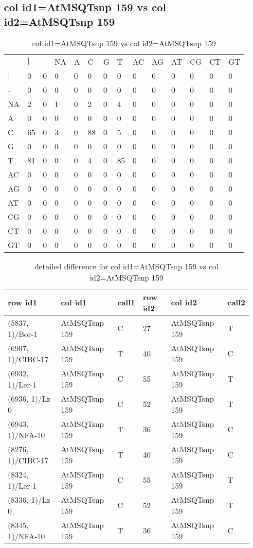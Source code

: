 \subsection{col id1=AtMSQTsnp 159 vs col id2=AtMSQTsnp 159}
\begin{center}
\begin{longtable}{|l|l|l|l|l|l|l|l|l|l|l|l|l|l|}
\caption{col id1=AtMSQTsnp 159 vs col id2=AtMSQTsnp 159} \label{table_dm732}\\
\hline
\\
\hline
&$|$&-&NA&A&C&G&T&AC&AG&AT&CG&CT&GT\\
$|$&0&0&0&0&0&0&0&0&0&0&0&0&0\\
-&0&0&0&0&0&0&0&0&0&0&0&0&0\\
NA&2&0&1&0&2&0&4&0&0&0&0&0&0\\
A&0&0&0&0&0&0&0&0&0&0&0&0&0\\
C&65&0&3&0&88&0&5&0&0&0&0&0&0\\
G&0&0&0&0&0&0&0&0&0&0&0&0&0\\
T&81&0&0&0&4&0&85&0&0&0&0&0&0\\
AC&0&0&0&0&0&0&0&0&0&0&0&0&0\\
AG&0&0&0&0&0&0&0&0&0&0&0&0&0\\
AT&0&0&0&0&0&0&0&0&0&0&0&0&0\\
CG&0&0&0&0&0&0&0&0&0&0&0&0&0\\
CT&0&0&0&0&0&0&0&0&0&0&0&0&0\\
GT&0&0&0&0&0&0&0&0&0&0&0&0&0\\
\hline
\end{longtable}
\end{center}

\begin{center}
\begin{longtable}{|l|l|l|l|l|l|}
\caption{detailed difference for col id1=AtMSQTsnp 159 vs col id2=AtMSQTsnp 159} \label{table_dm733}\\
\hline
row id1&col id1&call1&row id2&col id2&call2\\
\hline
(5837, 1)/Bor-1&AtMSQTsnp 159&C&27&AtMSQTsnp 159&T\\
(6907, 1)/CIBC-17&AtMSQTsnp 159&T&40&AtMSQTsnp 159&C\\
(6932, 1)/Ler-1&AtMSQTsnp 159&C&55&AtMSQTsnp 159&T\\
(6936, 1)/Lz-0&AtMSQTsnp 159&C&52&AtMSQTsnp 159&T\\
(6943, 1)/NFA-10&AtMSQTsnp 159&T&36&AtMSQTsnp 159&C\\
(8276, 1)/CIBC-17&AtMSQTsnp 159&T&40&AtMSQTsnp 159&C\\
(8324, 1)/Ler-1&AtMSQTsnp 159&C&55&AtMSQTsnp 159&T\\
(8336, 1)/Lz-0&AtMSQTsnp 159&C&52&AtMSQTsnp 159&T\\
(8345, 1)/NFA-10&AtMSQTsnp 159&T&36&AtMSQTsnp 159&C\\
\hline
\end{longtable}
\end{center}

